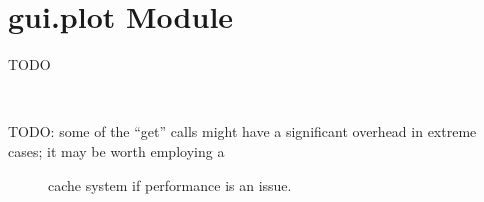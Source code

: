 \documentclass[letterpaper,10pt,english,openany,oneside]{sphinxmanual}
\begin{document}

\begin{fulllineitems}
\label{\detokenize{api:spookyconsole.gui.core.Window}}
\end{fulllineitems}



\section{gui.plot Module}
\label{\detokenize{api:module-spookyconsole.gui.plot}}\label{\detokenize{api:gui-plot-module}}
TODO

\begin{fulllineitems}
\label{\detokenize{api:spookyconsole.gui.plot.DockablePlot}}
\end{fulllineitems}


\begin{fulllineitems}
\label{\detokenize{api:spookyconsole.gui.plot.Plot}}~\begin{description}
\item[{TODO: some of the “get” calls might have a significant overhead in extreme cases; it may be worth employing a}] \leavevmode
cache system if performance is an issue.

\end{description}

\end{fulllineitems}


\begin{fulllineitems}
\label{\detokenize{api:spookyconsole.gui.plot.PlotToolbar}}
\end{fulllineitems}
\end{document}
